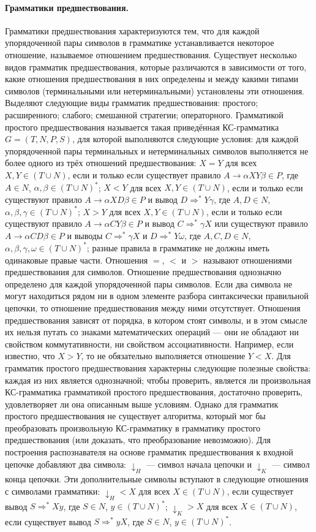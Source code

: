 \documentclass[a4paper,12pt]{article}
\begin{document}
\paragraph{Грамматики предшествования.}
Грамматики предшествования характеризуются тем, что для каждой упорядоченной пары символов в грамматике устанавливается некоторое отношение, называемое отношением предшествования. Существует несколько видов грамматик предшествования, которые различаются в зависимости от того, какие отношения предшествования в них определены и между какими типами символов (терминальными или нетерминальными) установлены эти отношения. Выделяют следующие виды грамматик предшествования: простого; расширенного; слабого; смешанной стратегии; операторного. Грамматикой простого предшествования называется такая приведённая КС-грамматика \(G=(T,N,P,S)\), для которой выполняются следующие условия: для каждой упорядоченной пары терминальных и нетерминальных символов выполняется не более одного из трёх отношений предшествования: \(X=Y\) для всех \(X,Y\in(T\cup N)\), если и только если существует правило \(A\to\alpha XY\beta\in P\), где \(A\in N\), \(\alpha,\beta\in(T\cup N)^*\); \(X<Y\) для всех \(X,Y\in(T\cup N)\), если и только если существуют правило \(A\to\alpha XD\beta\in P\) и вывод \(D\Rightarrow^*Y\gamma\), где \(A,D\in N\), \(\alpha,\beta,\gamma\in(T\cup N)^*\); \(X>Y\) для всех \(X,Y\in(T\cup N)\), если и только если существуют правило \(A\to\alpha CY\beta\in P\) и вывод \(C\Rightarrow^*\gamma X\) или существуют правило \(A\to\alpha CD\beta\in P\) и выводы \(C\Rightarrow^*\gamma X\) и \(D\Rightarrow^*Y\omega\), где \(A,C,D\in N\), \(\alpha,\beta,\gamma,\omega\in(T\cup N)^*\); разные правила в грамматике не должны иметь одинаковые правые части. Отношения \(=\), \(<\) и \(>\) называют отношениями предшествования для символов. Отношение предшествования однозначно определено для каждой упорядоченной пары символов. Если два символа не могут находиться рядом ни в одном элементе разбора синтаксически правильной цепочки, то отношение предшествования между ними отсутствует. Отношения предшествования зависят от порядка, в котором стоят символы, и в этом смысле их нельзя путать со знаками математических операций — они не обладают ни свойством коммутативности, ни свойством ассоциативности. Например, если известно, что \(X>Y\), то не обязательно выполняется отношение \(Y<X\). Для грамматик простого предшествования характерны следующие полезные свойства: каждая из них является однозначной; чтобы проверить, является ли произвольная КС-грамматика грамматикой простого предшествования, достаточно проверить, удовлетворяет ли она описанным выше условиям. Однако для грамматик простого предшествования не существует алгоритма, который мог бы преобразовать произвольную КС-грамматику в грамматику простого предшествования (или доказать, что преобразование невозможно). Для построения распознавателя на основе грамматик предшествования к входной цепочке добавляют два символа: \(\downarrow_H\) — символ начала цепочки и \(\downarrow_K\) — символ конца цепочки. Эти дополнительные символы вступают в следующие отношения с символами грамматики: \(\downarrow_H<X\) для всех \(X\in(T\cup N)\), если существует вывод \(S\Rightarrow^*Xy\), где \(S\in N\), \(y\in(T\cup N)^*\); \(\downarrow_K>X\) для всех \(X\in(T\cup N)\), если существует вывод \(S\Rightarrow^*yX\), где \(S\in N\), \(y\in(T\cup N)^*\).
\end{document}
